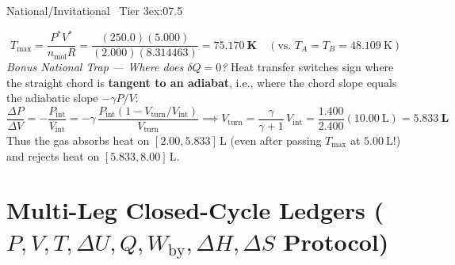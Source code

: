 \begin{workedexample}{National/Invitational \textbar\ Tier 3}{ex:07.5}
\begin{enumerate}
  \[
    T_{\max} = \frac{P^* V^*}{n_{\mathrm{mol}}R} = \frac{(250.0)(5.000)}{(2.000)(8.314463)} = \mathbf{\SI{75.170}{\kelvin}} \quad (\text{vs.\ } T_A = T_B = \SI{48.109}{\kelvin})
  \]
  \emph{Bonus National Trap — Where does $\delta Q = 0$?} Heat transfer switches sign where the straight chord is \textbf{tangent to an adiabat}, i.e., where the chord slope equals the adiabatic slope $-\gamma P/V$:
  \[
    \frac{\Delta P}{\Delta V} = -\frac{P_{\mathrm{int}}}{V_{\mathrm{int}}} = -\gamma\,\frac{P_{\mathrm{int}}(1 - V_{\mathrm{turn}}/V_{\mathrm{int}})}{V_{\mathrm{turn}}} \implies \boxed{V_{\mathrm{turn}} = \frac{\gamma}{\gamma + 1}\,V_{\mathrm{int}}} = \frac{1.400}{2.400}(\SI{10.00}{\liter}) = \mathbf{\SI{5.833}{\liter}}
  \]
  Thus the gas absorbs heat on $[2.00, 5.833]\,\si{\liter}$ (even after passing $T_{\max}$ at $\SI{5.00}{\liter}$!) and rejects heat on $[5.833, 8.00]\,\si{\liter}$.
\end{enumerate}
\end{workedexample}

\section[Multi-Leg Closed-Cycle Ledgers ($P, V, T, \Delta U, Q, W_{\mathrm{by}}$)]{Multi-Leg Closed-Cycle Ledgers ($P, V, T, \Delta U, Q, W_{\mathrm{by}}, \Delta H, \Delta S$ Protocol)}\label{sec:07.5}

